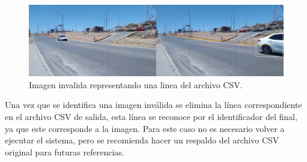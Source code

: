 \begin{figure}[H]
    \centering
    \includegraphics[width=1\textwidth]{Metodologia/imgs/Invalido.jpg}
    \caption{Imagen invalida representando una linea del archivo CSV.}
    \label{fig:ImagenInvalida}
\end{figure}

Una vez que se identifica una imagen inválida se elimina la línea correspondiente en el archivo CSV de salida, esta línea se reconoce por el identificador del final, ya que este corresponde a la imagen. Para este caso no es necesario volver a ejecutar el sistema, pero se recomienda hacer un respaldo del archivo CSV original para futuras referencias.

